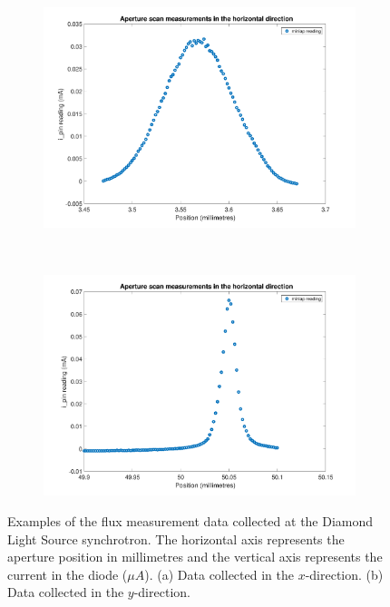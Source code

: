 \begin{figure}
        \centering
        \begin{subfigure}[b]{1.0\textwidth}
                \centering
                \includegraphics[width=\textwidth]{figures/beam/ApertureScans_x_data.pdf}
                \caption{}
                \label{fig:Original aperture measurments inx-direction - DLS}
        \end{subfigure}
				\\
        \begin{subfigure}[b]{1.0\textwidth}
                \centering
                \includegraphics[width=\textwidth]{figures/beam/ApertureScans_y_data.pdf}
                \caption{}
                \label{fig:Original aperture measurments in y-direction - DLS}
        \end{subfigure}
        \caption[Flux measurements collected using 1D aperture scans at the Diamond Light Source synchrotron.]{Examples of the flux measurement data collected at the Diamond Light Source synchrotron.
        The horizontal axis represents the aperture position in millimetres and the vertical axis represents the current in the diode ($\mu A$).
        (a) Data collected in the $x$-direction.
        (b) Data collected in the $y$-direction.}
        \label{fig:Original aperture measurments - DLS}
\end{figure}

